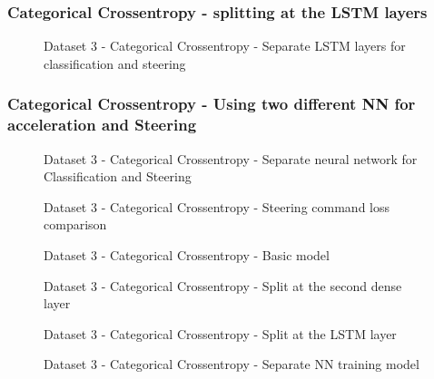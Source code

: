 \subsubsection*{Categorical Crossentropy - splitting at the LSTM layers}
\begin{figure}[h]
	\centering
    \def\svgwidth{\textwidth}
    \caption{Dataset 3 - Categorical Crossentropy - Separate LSTM layers for
    classification and steering}
    \label{fig:ds3categoricalcrossentropylstm}
\end{figure}
\subsubsection*{Categorical Crossentropy - Using two different NN for acceleration and
Steering}
\begin{figure}[h]
	\centering
    \def\svgwidth{\textwidth}
    \caption{Dataset 3 - Categorical Crossentropy - Separate neural network for
    Classification and Steering}
    \label{fig:ds3categoricalcrossentropy2nn}
\end{figure}

\begin{figure}[h]
	\centering
    \def\svgwidth{\textwidth}
    \caption{Dataset 3 - Categorical Crossentropy - Steering command loss comparison}
    \label{fig:ds3categoricalcrossentropysteeringcompare}
\end{figure}

\begin{figure}[h]
	\centering
    \def\svgwidth{0.5\textwidth}
    \caption{Dataset 3 - Categorical Crossentropy - Basic model}
    \label{fig:steeringbasicmodel}
\end{figure}
\begin{figure}[h]
	\centering
    \def\svgwidth{0.5\textwidth}
    \caption{Dataset 3 - Categorical Crossentropy - Split at the second dense layer}
    \label{fig:steeringdensesplit}
\end{figure}
\begin{figure}[h]
	\centering
    \def\svgwidth{0.5\textwidth}
    \caption{Dataset 3 - Categorical Crossentropy - Split at the LSTM layer}
    \label{fig:steeringlstmsplit}
\end{figure}
\begin{figure}[h]
	\centering
    \def\svgwidth{0.5\textwidth}
    \caption{Dataset 3 - Categorical Crossentropy - Separate NN training model}
    \label{fig:steeringnnsplit}
\end{figure}
